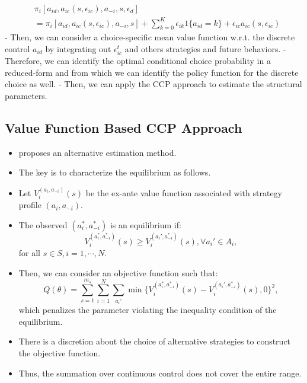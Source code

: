 \documentclass[
]{book}
\providecommand{\tightlist}{%
  \setlength{\itemsep}{0pt}\setlength{\parskip}{0pt}}
\begin{document}
\begin{equation}
\begin{split}
&\pi_i[a_{id}, a_{ic}(s, \epsilon_{ic}), a_{-i}, s, \epsilon_{d}] \\
&= \pi_i[a_{id}, a_{ic}(s, \epsilon_{ic}), a_{-i}, s] +\sum_{k = 0}^K \epsilon_{ik}1\{a_{id} = k\} + \epsilon_{ic} a_{ic}(s, \epsilon_{ic})
\end{split}
\end{equation}
- Then, we can consider a choice-specific mean value function w.r.t. the discrete control \(a_{id}\) by integrating out \(\epsilon_{ic}^t\) and others strategies and future behaviors.
- Therefore, we can identify the optimal conditional choice probability in a reduced-form and from which we can identify the policy function for the discrete choice as well.
- Then, we can apply the CCP approach to estimate the structural parameters.

\hypertarget{value-function-based-ccp-approach}{%
\subsection{Value Function Based CCP Approach}\label{value-function-based-ccp-approach}}

\begin{itemize}
\tightlist
\item
  \citet{bajariEstimatingDynamicModels2007} proposes an alternative estimation method.
\item
  The key is to characterize the equilibrium as follows.
\item
  Let \(V_i^{(a_i, a_{-i})}(s)\) be the ex-ante value function associated with strategy profile \((a_i, a_{-i})\).
\item
  The observed \((a_i^*, a_{-i}^*)\) is an equilibrium if:
  \begin{equation}
  V_i^{(a_i^*, a_{-i}^*)}(s) \ge V_i^{(a_i', a_{-i}^*)}(s), \forall a_i' \in A_i,
  \end{equation}
  for all \(s \in S, i = 1, \cdots, N\).
\item
  Then, we can consider an objective function such that:
  \begin{equation}
  Q(\theta) = \sum_{s = 1}^{m_s} \sum_{i = 1}^N \sum_{a_i'} \min\{V_i^{(a_i^*, a_{-i}^*)}(s) - V_i^{(a_i', a_{-i}^*)}(s), 0\}^2,
  \end{equation}
  which penalizes the parameter violating the inequality condition of the equilibrium.
\item
  There is a discretion about the choice of alternative strategies to construct the objective function.
\item
  Thus, the summation over continuous control does not cover the entire range.
\end{itemize}
\end{document}
